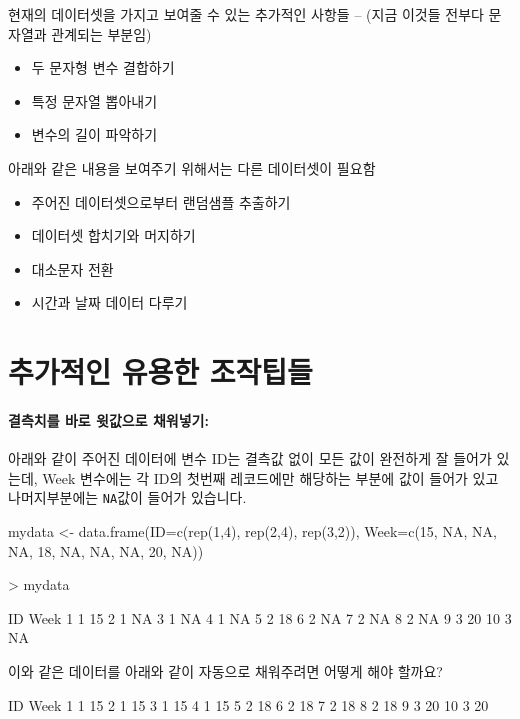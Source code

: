 \documentclass[tutorial.tex]{subfiles}
\begin{document}
 
현재의 데이터셋을 가지고 보여줄 수 있는 추가적인 사항들 -- (지금 이것들 전부다 문자열과 관계되는 부분임) 
\begin{itemize}
\item 두 문자형 변수 결합하기
\item 특정 문자열 뽑아내기
\item 변수의 길이 파악하기
\end{itemize}

아래와 같은 내용을 보여주기 위해서는 다른 데이터셋이 필요함 
\begin{itemize}
\item 주어진 데이터셋으로부터 랜덤샘플 추출하기
\item 데이터셋 합치기와 머지하기 
\item 대소문자 전환 
\item 시간과 날짜 데이터 다루기 
\end{itemize}



\section{추가적인 유용한 조작팁들}
 
\paragraph{결측치를 바로 윗값으로 채워넣기: } 아래와 같이 주어진 데이터에 변수 ID는 결측값 없이 모든 값이 완전하게 잘 들어가 있는데, Week 변수에는 각 ID의 첫번째 레코드에만 해당하는 부분에 값이 들어가 있고 나머지부분에는 \texttt{NA}값이 들어가 있습니다. 

\begin{Schunk}
\begin{Soutput}
mydata <- data.frame(ID=c(rep(1,4), rep(2,4), rep(3,2)), Week=c(15, NA, NA, NA, 18, NA, NA, NA, 20, NA))

> mydata		

   ID Week
1   1   15
2   1   NA
3   1   NA
4   1   NA
5   2   18
6   2   NA
7   2   NA
8   2   NA
9   3   20
10  3   NA
\end{Soutput}
\end{Schunk}

이와 같은 데이터를 아래와 같이 자동으로 채워주려면 어떻게 해야 할까요? 	
	
\begin{Schunk}
\begin{Soutput}
   ID Week
1   1   15
2   1   15
3   1   15
4   1   15
5   2   18
6   2   18
7   2   18
8   2   18
9   3   20
10  3   20
\end{Soutput}
\end{Schunk}
	
\end{document}
